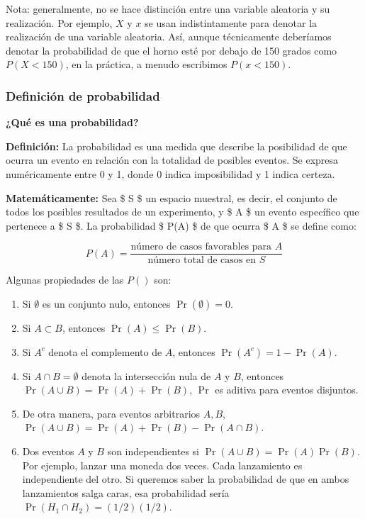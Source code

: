 \documentclass[
  letterpaper,
  DIV=11,
  numbers=noendperiod]{scrartcl}
\providecommand{\tightlist}{%
  \setlength{\itemsep}{0pt}\setlength{\parskip}{0pt}}\usepackage{longtable,booktabs,array}
\begin{document}
Nota: generalmente, no se hace distinción entre una variable aleatoria y
su realización. Por ejemplo, \(X\) y \(x\) se usan indistintamente para
denotar la realización de una variable aleatoria. Así, aunque
técnicamente deberíamos denotar la probabilidad de que el horno esté por
debajo de 150 grados como \(P(X<150)\), en la práctica, a menudo
escribimos \(P(x<150)\).

\hypertarget{definiciuxf3n-de-probabilidad}{%
\subsubsection{Definición de
probabilidad}\label{definiciuxf3n-de-probabilidad}}

\textbf{¿Qué es una probabilidad?}

\textbf{Definición:} La probabilidad es una medida que describe la
posibilidad de que ocurra un evento en relación con la totalidad de
posibles eventos. Se expresa numéricamente entre 0 y 1, donde 0 indica
imposibilidad y 1 indica certeza.

\textbf{Matemáticamente:} Sea \$ S \$ un espacio muestral, es decir, el
conjunto de todos los posibles resultados de un experimento, y \$ A \$
un evento específico que pertenece a \$ S \$. La probabilidad \$ P(A) \$
de que ocurra \$ A \$ se define como:

\[ P(A) = \frac{\text{número de casos favorables para } A}{\text{número total de casos en } S} \]

Algunas propiedades de las \(P()\) son:

\begin{enumerate}
\def\labelenumi{\arabic{enumi}.}
\tightlist
\item
  Si \(\emptyset\) es un conjunto nulo, entonces \(\Pr(\emptyset)=0\).
\item
  Si \(A \subset B\), entonces \(\Pr(A)\leq \Pr(B)\).
\item
  Si \(A^c\) denota el complemento de \(A\), entonces
  \(\Pr(A^c)=1-\Pr(A)\).
\item
  Si \(A \cap B = \emptyset\) denota la intersección nula de \(A\) y
  \(B\), entonces \(\Pr(A \cup B)=\Pr(A) + \Pr(B)\), \(\Pr\) es aditiva
  para eventos disjuntos.
\item
  De otra manera, para eventos arbitrarios \(A, B\),
  \(\Pr(A \cup B)=\Pr(A) + \Pr(B)-\Pr(A\cap B)\).
\item
  Dos eventos \(A\) y \(B\) son independientes si
  \(\Pr(A \cup B)=\Pr(A)\Pr(B)\). Por ejemplo, lanzar una moneda dos
  veces. Cada lanzamiento es independiente del otro. Si queremos saber
  la probabilidad de que en ambos lanzamientos salga caras, esa
  probabilidad sería \(\Pr(H_1\cap H_2)=(1/2)(1/2)\).
\end{enumerate}
\end{document}
